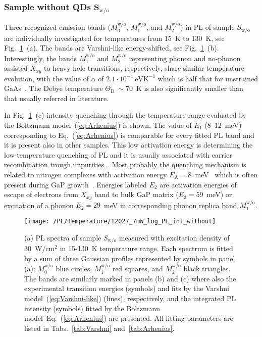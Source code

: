 \subsubsection*{Sample without QDs $\mathbf{S_\mathrm{w/o}}$}
%
Three recognized emission bands ($M_0^\mathrm{w/o}$, $M_1^\mathrm{w/o}$, and $M_2^\mathrm{w/o}$) in PL of sample ${S_\mathrm{w/o}}$ are individually investigated for temperatures from 15~K to 130~K, see Fig.~\ref{fig:QD_wo_temp}~(a). The bands are  Varshni-like energy-shifted,
see Fig.~\ref{fig:QD_wo_temp}~(b). Interestingly, the bands $M_1^\mathrm{w/o}$ and $M_2^\mathrm{w/o}$ representing phonon and no-phonon assisted $X_{xy}$ to heavy hole transitions, respectively, share similar temperature evolution, with the value of $\alpha$ of $2.1\cdot10^{-4}~\mathrm{eVK^{-1}}$ which is half that for unstrained GaAs~\cite{ioffe, Vurgaftman}. The Debye temperature $\Theta_\mathrm{D}~\sim70$~K is also significantly smaller than that usually referred in literature.

In Fig.~\ref{fig:QD_wo_temp}~(c) intensity quenching through the temperature range evaluated by the Boltzmann model~(\ref{eq:Arhenius}) is shown. The value of $E_1$ (8--12~meV) corresponding to Eq.~(\ref{eq:Arhenius}) is comparable for every fitted PL band and it is present also in other samples. This low activation energy is determining the low-temperature quenching of PL and it is usually associated with carrier recombination trough impurities~\cite{YuCardona}. Most probably the quenching mechanism is related to nitrogen complexes with activation energy $E_\mathrm{A}=8$~meV~\cite{ioffe} which is often present during GaP growth~\cite{Skazochkin_GaPtraps}. Energies labeled $E_2$ are activation energies of escape of electrons from $X_{xy}$ band to bulk GaP matrix ($E_2=59$~meV) or excitation of a phonon $E_2=29$~meV in corresponding phonon replica band $M_1^\mathrm{w/o}$. 
%
\begin{figure}
	\centering
	\texttt{[image: /PL/temperature/12027\_7mW\_log\_PL\_int\_without]}
	\caption{(a) PL spectra of sample $S_\mathrm{w/o}$ measured with excitation density of 30~W/cm$^2$ in 15-130~K temperature range. Each spectrum is fitted by a sum of three Gaussian profiles represented by symbols in panel (a): $M_0^\mathrm{w/o}$ blue circles, $M_1^\mathrm{w/o}$ red squares, and $M_2^\mathrm{w/o}$ black triangles. The bands are similarly marked in panels (b) and (c) where also the experimental transition energies (symbols) and fits by the Varshni model~(\ref{eq:Varshni-like}) (lines), respectively, and the integrated PL intensity (symbols) fitted by the Boltzmann model~Eq.~(\ref{eq:Arhenius}) are presented. All fitting parameters are listed in Tabs.~\ref{tab:Varshni} and~\ref{tab:Arhenius}.}
	\label{fig:QD_wo_temp}
\end{figure}


